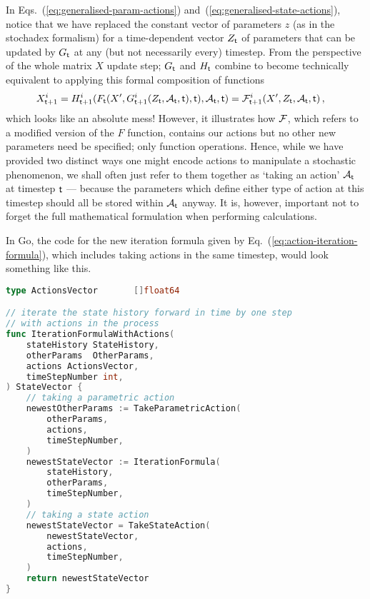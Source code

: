 In Eqs.~(\ref{eq:generalised-param-actions}) and~(\ref{eq:generalised-state-actions}), notice that we have replaced the constant vector of parameters $z$ (as in the stochadex formalism) for a time-dependent vector $Z_{{\sf t}}$ of parameters that can be updated by $G_{\sf t}$ at any (but not necessarily every) timestep. From the perspective of the whole matrix $X$ update step; $G_{\sf t}$ and $H_{\sf t}$ combine to become technically equivalent to applying this formal composition of functions
\begin{align}
X^i_{{\sf t}+1} &= H^i_{{\sf t}+1}(F_{\sf t}(X', G_{{\sf t}+1}^i(Z_{{\sf t}}, {\cal A}_{{\sf t}}, {\sf t}), {\sf t}), {\cal A}_{\sf t}, {\sf t}) = {\cal F}^i_{{\sf t}+1}(X', Z_{{\sf t}}, {\cal A}_{\sf t}, {\sf t}) \label{eq:action-iteration-formula}\,,
\end{align}
which looks like an absolute mess! However, it illustrates how ${\cal F}$, which refers to a modified version of the $F$ function, contains our actions but no other new parameters need be specified; only function operations. Hence, while we have provided two distinct ways one might encode actions to manipulate a stochastic phenomenon, we shall often just refer to them together as `taking an action' ${\cal A}_{\sf t}$ at timestep ${\sf t}$ --- because the parameters which define either type of action at this timestep should all be stored within ${\cal A}_{\sf t}$ anyway. It is, however, important not to forget the full mathematical formulation when performing calculations. 

In Go, the code for the new iteration formula given by Eq.~(\ref{eq:action-iteration-formula}), which includes taking actions in the same timestep, would look something like this.

\begin{lstlisting}[language=Go]
type ActionsVector       []float64

// iterate the state history forward in time by one step
// with actions in the process
func IterationFormulaWithActions(
    stateHistory StateHistory, 
    otherParams  OtherParams,
    actions ActionsVector,
    timeStepNumber int,
) StateVector {
    // taking a parametric action
    newestOtherParams := TakeParametricAction(
        otherParams, 
        actions,
        timeStepNumber,
    )
    newestStateVector := IterationFormula(
        stateHistory, 
        otherParams,
        timeStepNumber,
    )
    // taking a state action
    newestStateVector = TakeStateAction(
        newestStateVector,
        actions,
        timeStepNumber,
    )
    return newestStateVector
}
\end{lstlisting}